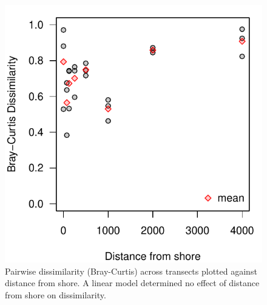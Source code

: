 \documentclass[11pt,letterpaper]{article} %
\begin{document}
\begin{figure}[h!] %
  \centering
    \includegraphics[width=1\textwidth]{../../Figures/dissimilarity_from_shore.pdf}
    \caption{Pairwise dissimilarity (Bray-Curtis) across transects plotted against distance from shore. A linear model determined no effect of distance from shore on dissimilarity.}
  \label{dissimilarity_from_shore} %
\end{figure}
\end{document}
